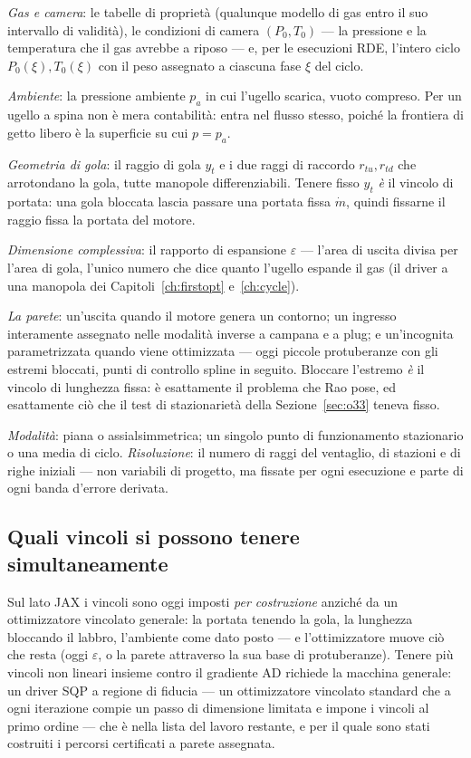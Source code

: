 \emph{Gas e camera}: le tabelle di proprietà (qualunque modello di gas
entro il suo intervallo di validità), le condizioni di camera
$(P_0, T_0)$ --- la pressione e la temperatura che il gas avrebbe a
riposo --- e, per le esecuzioni RDE, l'intero ciclo
$P_0(\xi), T_0(\xi)$ con il peso assegnato a ciascuna fase $\xi$ del
ciclo.

\emph{Ambiente}: la pressione ambiente $p_a$ in cui l'ugello scarica,
vuoto compreso. Per un ugello a spina non è mera contabilità: entra
nel flusso stesso, poiché la frontiera di getto libero è la superficie
su cui $p = p_a$.

\emph{Geometria di gola}: il raggio di gola $y_t$ e i due raggi di
raccordo $r_{tu}, r_{td}$ che arrotondano la gola, tutte manopole
differenziabili. Tenere fisso $y_t$ \emph{è} il vincolo di portata:
una gola bloccata lascia passare una portata fissa $\dot m$, quindi
fissarne il raggio fissa la portata del motore.

\emph{Dimensione complessiva}: il rapporto di espansione $\varepsilon$
--- l'area di uscita divisa per l'area di gola, l'unico numero che
dice quanto l'ugello espande il gas (il driver a una manopola dei
Capitoli~\ref{ch:firstopt} e~\ref{ch:cycle}).

\emph{La parete}: un'uscita quando il motore genera un contorno; un
ingresso interamente assegnato nelle modalità inverse a campana e a
plug; e un'incognita parametrizzata quando viene ottimizzata --- oggi
piccole protuberanze con gli estremi bloccati, punti di controllo
spline in seguito. Bloccare l'estremo \emph{è} il vincolo di lunghezza
fissa: è esattamente il problema che Rao pose, ed esattamente ciò che
il test di stazionarietà della Sezione~\ref{sec:o33} teneva fisso.

\emph{Modalità}: piana o assialsimmetrica; un singolo punto di
funzionamento stazionario o una media di ciclo. \emph{Risoluzione}: il
numero di raggi del ventaglio, di stazioni e di righe iniziali --- non
variabili di progetto, ma fissate per ogni esecuzione e parte di ogni
banda d'errore derivata.

\subsection{Quali vincoli si possono tenere simultaneamente}

Sul lato JAX i vincoli sono oggi imposti \emph{per costruzione}
anziché da un ottimizzatore vincolato generale: la portata tenendo la
gola, la lunghezza bloccando il labbro, l'ambiente come dato posto ---
e l'ottimizzatore muove ciò che resta (oggi $\varepsilon$, o la parete
attraverso la sua base di protuberanze). Tenere più vincoli non
lineari insieme contro il gradiente AD richiede la macchina generale:
un driver SQP a regione di fiducia --- un ottimizzatore vincolato
standard che a ogni iterazione compie un passo di dimensione limitata
e impone i vincoli al primo ordine --- che è nella lista del lavoro
restante, e per il quale sono stati costruiti i percorsi certificati a
parete assegnata.

